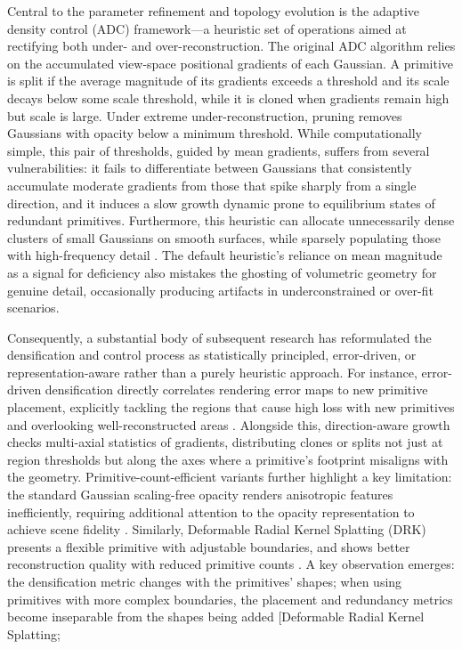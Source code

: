 \documentclass[11pt,a4paper]{article}
\begin{document}
Central to the parameter refinement and topology evolution is the adaptive density control (ADC) framework---a heuristic set of operations aimed at rectifying both under- and over-reconstruction. The original ADC algorithm relies on the accumulated view-space positional gradients of each Gaussian. A primitive is split if the average magnitude of its gradients exceeds a threshold and its scale decays below some scale threshold, while it is cloned when gradients remain high but scale is large. Under extreme under-reconstruction, pruning removes Gaussians with opacity below a minimum threshold. While computationally simple, this pair of thresholds, guided by mean gradients, suffers from several vulnerabilities: it fails to differentiate between Gaussians that consistently accumulate moderate gradients from those that spike sharply from a single direction, and it induces a slow growth dynamic prone to equilibrium states of redundant primitives. Furthermore, this heuristic can allocate unnecessarily dense clusters of small Gaussians on smooth surfaces, while sparsely populating those with high-frequency detail \cite{arxiv:2412.11752v2,arxiv:2504.13204v2}. The default heuristic's reliance on mean magnitude as a signal for deficiency also mistakes the ghosting of volumetric geometry for genuine detail, occasionally producing artifacts in underconstrained or over-fit scenarios.

Consequently, a substantial body of subsequent research has reformulated the densification and control process as statistically principled, error-driven, or representation-aware rather than a purely heuristic approach. For instance, error-driven densification directly correlates rendering error maps to new primitive placement, explicitly tackling the regions that cause high loss with new primitives and overlooking well-reconstructed areas \cite{arxiv:2404.04211v1}. Alongside this, direction-aware growth checks multi-axial statistics of gradients, distributing clones or splits not just at region thresholds but along the axes where a primitive's footprint misaligns with the geometry. Primitive-count-efficient variants further highlight a key limitation: the standard Gaussian scaling-free opacity renders anisotropic features inefficiently, requiring additional attention to the opacity representation to achieve scene fidelity \cite{arxiv:2504.13204v2}. Similarly, Deformable Radial Kernel Splatting (DRK) presents a flexible primitive with adjustable boundaries, and shows better reconstruction quality with reduced primitive counts \cite{arxiv:2412.11752v2}. A key observation emerges: the densification metric changes with the primitives' shapes; when using primitives with more complex boundaries, the placement and redundancy metrics become inseparable from the shapes being added [Deformable Radial Kernel Splatting;
\end{document}
